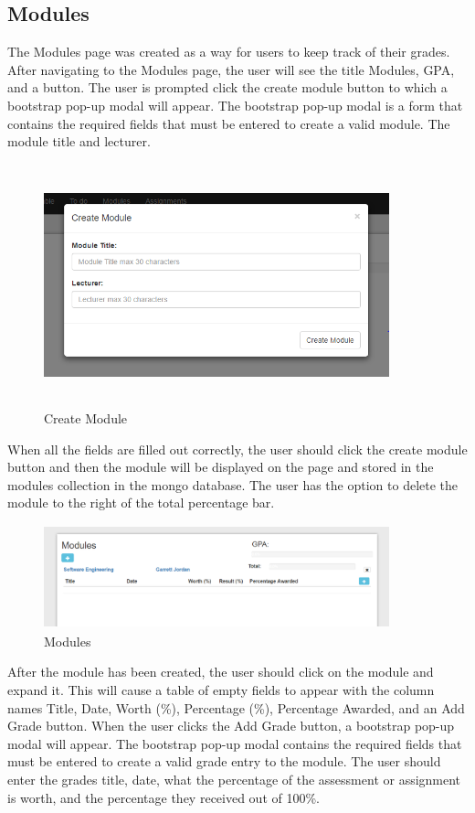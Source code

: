 \subsection{Modules}
The Modules page was created as a way for users to keep track of their grades. After navigating to the Modules page, the user will see the title Modules, GPA, and a button. The user is prompted click the create module button to which a bootstrap pop-up modal will appear. The bootstrap pop-up modal is a form that contains the required fields that must be entered to create a valid module. The module title and lecturer.

\begin{figure}[h]
\centering
\includegraphics[width=10cm, height=7cm]{img/createModule}
\caption{Create Module}
\label{fig:CreateModule}
\end{figure}
\newpage
When all the fields are filled out correctly, the user should click the create module button and then the module will be displayed on the page and stored in the modules collection in the mongo database. The user has the option to delete the module to the right of the total percentage bar.

\begin{figure}[h]
\centering
\includegraphics[width=10cm, height=3cm]{img/addedModule}
\caption{Modules}
\label{fig:Modules}
\end{figure}

After the module has been created, the user should click on the module and expand it. This will cause a table of empty fields to appear with the column names Title, Date, Worth (\%), Percentage (\%), Percentage Awarded, and an Add Grade button. When the user clicks the Add Grade button, a bootstrap pop-up modal will appear. The bootstrap pop-up modal contains the required fields that must be entered to create a valid grade entry to the module. The user should enter the grades title, date, what the percentage of the assessment or assignment is worth, and the percentage they received out of 100\%. 


